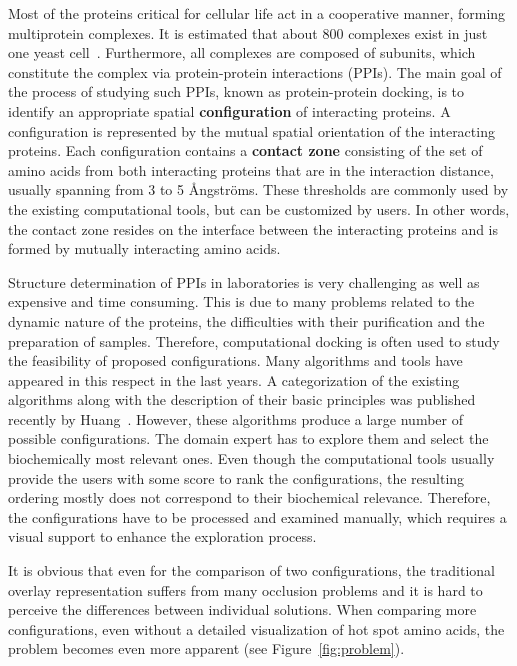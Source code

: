\documentclass{bmcart}
\begin{document}
Most of the proteins critical for cellular life act in a cooperative manner, forming multiprotein complexes. 
It is estimated that about 800 complexes exist in just one yeast cell~\cite{Gavin}. 
Furthermore, all complexes are composed of subunits, which constitute the complex via protein-protein interactions (PPIs).
The main goal of the process of studying such PPIs, known as protein-protein docking, is to identify an appropriate spatial \textbf{configuration} of interacting proteins.
A configuration is represented by the mutual spatial orientation of the interacting proteins.
Each configuration contains a \textbf{contact zone} consisting of the set of amino acids from both interacting proteins that are in the interaction distance, usually spanning from 3 to 5 \AA ngstr\"{o}ms.
These thresholds are commonly used by the existing computational tools, but can be customized by users.
In other words, the contact zone resides on the interface between the interacting proteins and is formed by mutually interacting amino acids.

Structure determination of PPIs in laboratories is very challenging as well as expensive and time consuming.
This is due to many problems related to the dynamic nature of the proteins, the difficulties with their purification and the preparation of samples.
Therefore, computational docking is often used to study the feasibility of proposed configurations.
Many algorithms and tools have appeared in this respect in the last years.
A categorization of the existing algorithms along with the description of their basic principles was published recently by Huang~\cite{Huang2014}.
However, these algorithms produce a large number of possible configurations.
The domain expert has to explore them and select the biochemically most relevant ones. 
Even though the computational tools usually provide the users with some score to rank the configurations, the resulting ordering mostly does not correspond to their biochemical relevance.
Therefore, the configurations have to be processed and examined manually, which requires a visual support to enhance the exploration process.

It is obvious that even for the comparison of two configurations, the traditional overlay representation suffers from many occlusion problems and it is hard to perceive the differences between individual solutions.
When comparing more configurations, even without a detailed visualization of hot spot amino acids, the problem becomes even more apparent (see Figure~\ref{fig:problem}).
\end{document}
